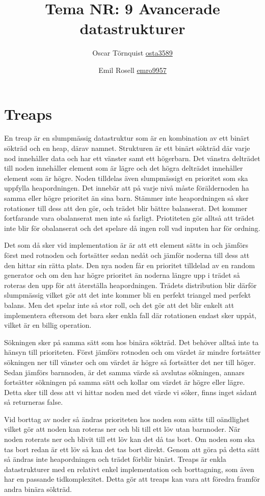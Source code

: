 \documentclass[a5paper,10pt,oneside]{article}
\title{Tema NR: 9 Avancerade datastrukturer}
\author{Oscar Törnquist \url{osta3589} \and Emil Rosell \url{emro9957}}
\begin{document}
\maketitle

\section*{Treaps}

En treap är en slumpmässig datastruktur som är en kombination av ett binärt sökträd och en heap, därav namnet. Strukturen är ett binärt sökträd där varje nod innehåller data och har ett vänster samt ett högerbarn. Det vänstra delträdet till noden innehåller element som är lägre och det högra delträdet innehåller element som är högre. Noden tilldelas även slumpmässigt en prioritet som ska uppfylla heapordningen. Det innebär att på varje nivå måste föräldernoden ha samma eller högre prioritet än sina barn. Stämmer inte heapordningen så sker rotationer till dess att den gör, och trädet blir bättre balanserat. Det kommer fortfarande vara obalanserat men inte så farligt. Priotiteten gör alltså att trädet inte blir för obalanserat och det spelare då ingen roll vad inputen har för ordning.

Det som då sker vid implementation är är att ett element sätts in och jämförs först med rotnoden och fortsätter sedan nedåt och jämför noderna till dess att den hittar sin rätta plats. Den nya noden får en prioritet tilldelad av en random generator och om den har högre prioritet än noderna längre upp i trädet så roteras den upp för att återställa heapordningen. Trädets distribution blir därför slumpmässig vilket gör att det inte kommer bli en perfekt triangel med perfekt balans. Men det spelar inte så stor roll, och det gör att det blir enkelt att implementera eftersom det bara sker enkla fall där rotationen endast sker uppåt, vilket är en billig operation. 

Sökningen sker på samma sätt som hos binära sökträd. Det behöver alltså inte ta hänsyn till prioriteten. Först jämförs rotnoden och om värdet är mindre fortsätter sökningen ner till vänster och om värdet är högre så fortsätter det ner till höger. Sedan jämförs barnnoden, är det samma värde så avslutas sökningen, annars fortsätter sökningen på samma sätt och kollar om värdet är högre eller lägre. Detta sker till dess att vi hittar noden med det värde vi söker, finns inget sådant så returneras false.

Vid borttag av noder så ändras prioriteten hos noden som sätts till oändlighet vilket gör att noden kan roteras ner och bli till ett löv utan barnnoder. När noden roterats ner och blivit till ett löv kan det då tas bort. Om noden som ska tas bort redan är ett löv så kan det tas bort direkt. Genom att göra på detta sätt så ändras inte heapordningen och trädet förblir binärt. Treaps är enkla datastrukturer med en relativt enkel implementation och borttagning, som även har en passande tidkomplexitet. Detta gör att treaps kan vara att föredra framför andra binära sökträd.  
\end{document}
